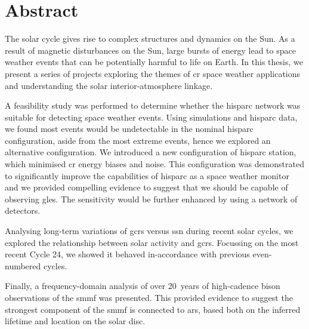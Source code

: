 \chapter*{Abstract}

The solar cycle gives rise to complex structures and dynamics on the Sun. As a result of magnetic disturbances on the Sun, large bursts of energy lead to space weather events that can be potentially harmful to life on Earth. In this thesis, we present a series of projects exploring the themes of \gls{cr} space weather applications and understanding the solar interior-atmosphere linkage. 

A feasibility study was performed to determine whether the \gls{hisparc} network was suitable for detecting space weather events. Using simulations and \gls{hisparc} data, we found most events would be undetectable in the nominal \gls{hisparc} configuration, aside from the most extreme events, hence we explored an alternative configuration. We introduced a new configuration of \gls{hisparc} station, which minimised \gls{cr} energy biases and noise. This configuration was demonstrated to significantly improve the capabilities of \gls{hisparc} as a space weather monitor and we provided compelling evidence to suggest that we should be capable of observing \glspl{gle}. The sensitivity would be further enhanced by using a network of detectors.

Analysing long-term variations of \glspl{gcr} versus \gls{ssn} during recent solar cycles, we explored the relationship between solar activity and \glspl{gcr}. Focussing on the most recent Cycle 24, we showed it behaved in-accordance with previous even-numbered cycles.


Finally, a frequency-domain analysis of over 20~years of high-cadence \gls{bison} observations of the \gls{smmf} was presented. This provided evidence to suggest the strongest component of the \gls{smmf} is connected to \glspl{ar}, based both on the inferred lifetime and location on the solar disc.